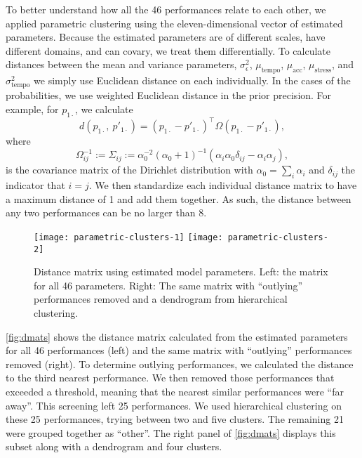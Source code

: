 \documentclass[12pt]{article}
\begin{document}
To better understand how all the 46 performances relate to each other,
we applied parametric clustering using the eleven-dimensional vector
of estimated parameters. Because the estimated parameters are of
different scales, have different domains, and can covary, we treat
them differentially. To calculate distances between the mean and
variance parameters, $\sigma^2_\epsilon$, $\mu_{\textrm{tempo}}$,
$\mu_{\textrm{acc}}$, $\mu_{\textrm{stress}}$, and
$\sigma^2_{\textrm{tempo}}$ we simply use Euclidean distance on each
individually. In the cases of the probabilities, we use weighted
Euclidean distance in the prior precision. For example, for
$p_{1\cdot}$, we calculate
\[
d\left(p_{1\cdot},\ p'_{1\cdot}\right) = (p_{1\cdot}-p'_{1\cdot})^\top
  \Omega (p_{1\cdot}-p'_{1\cdot}),
\]
where
\[
  \Omega^{-1}_{ij} := \Sigma_{ij} :=
  \alpha_0^{-2}(\alpha_0+1)^{-1}\left(\alpha_i\alpha_0 \delta_{ij}
    - \alpha_i\alpha_j\right),
\]
is the covariance matrix of the Dirichlet distribution with
$\alpha_0=\sum_i\alpha_i$ and $\delta_{ij}$ the indicator that
$i=j$. We then standardize each individual distance matrix to have a
maximum distance of 1 and add them together. As such, the distance
between any two performances can be no larger than 8.


\begin{figure}[t]
  \centering
  \texttt{[image: parametric-clusters-1]}
  \texttt{[image: parametric-clusters-2]}
  \caption{Distance matrix using estimated model parameters. Left: the
    matrix for all 46 parameters. Right: The same matrix with
    ``outlying'' performances removed and a dendrogram from hierarchical
    clustering.}
  \label{fig:dmats}
\end{figure}
\autoref{fig:dmats} shows the distance matrix calculated from the
estimated parameters for all 46 performances (left) and the same
matrix with ``outlying'' performances removed (right). To determine
outlying performances, we calculated the distance to the third nearest
performance. We then removed those performances that exceeded a
threshold, meaning that the nearest similar performances were ``far
away''. This screening left 25 performances. We used hierarchical
clustering on these 25 performances, trying between two and five
clusters. The remaining 21 were grouped together as ``other''. The
right panel of \autoref{fig:dmats} displays this subset along with a
dendrogram and four clusters.
\end{document}
